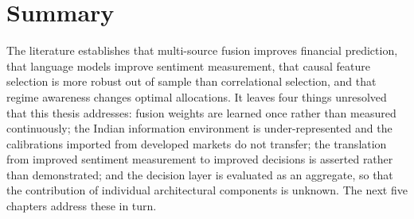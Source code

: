\section{Summary}

The literature establishes that multi-source fusion improves financial prediction, that language
models improve sentiment measurement, that causal feature selection is more robust out of sample
than correlational selection, and that regime awareness changes optimal allocations. It leaves
four things unresolved that this thesis addresses: fusion weights are learned once rather than
measured continuously; the Indian information environment is under-represented and the
calibrations imported from developed markets do not transfer; the translation from improved
sentiment measurement to improved decisions is asserted rather than demonstrated; and the
decision layer is evaluated as an aggregate, so that the contribution of individual architectural
components is unknown. The next five chapters address these in turn.
